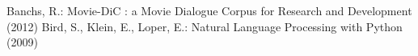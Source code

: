 \begin{thebibliography}{2}
%
Banchs, R.:
Movie-DiC : a Movie Dialogue Corpus for Research and Development (2012)
% 
Bird, S., Klein, E., Loper, E.: Natural Language Processing with Python (2009)
\end{thebibliography}